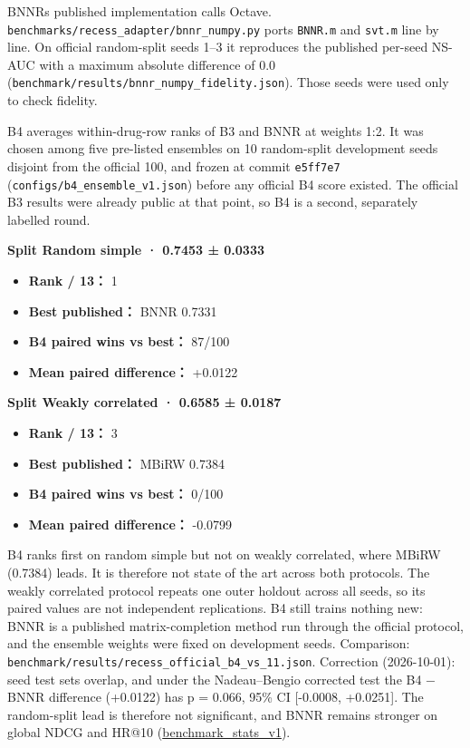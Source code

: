 \documentclass[
  10pt,
]{ctexart}
\providecommand{\tightlist}{%
  \setlength{\itemsep}{0pt}\setlength{\parskip}{0pt}}
\begin{document}
BNNR\textquotesingle s published implementation calls Octave.
\texttt{benchmarks/\allowbreak{}recess\_\allowbreak{}adapter/\allowbreak{}bnnr\_\allowbreak{}numpy.\allowbreak{}py} ports \texttt{BNNR.\allowbreak{}m}
and \texttt{svt.\allowbreak{}m} line by line. On official random-split seeds 1--3 it
reproduces the published per-seed NS-AUC with a maximum absolute
difference of 0.0
(\texttt{benchmark/\allowbreak{}results/\allowbreak{}bnnr\_\allowbreak{}numpy\_\allowbreak{}fidelity.\allowbreak{}json}). Those seeds
were used only to check fidelity.

B4 averages within-drug-row ranks of B3 and BNNR at weights 1:2. It was
chosen among five pre-listed ensembles on 10 random-split development
seeds disjoint from the official 100, and frozen at commit
\texttt{e5ff7e7} (\texttt{configs/\allowbreak{}b4\_\allowbreak{}ensemble\_\allowbreak{}v1.\allowbreak{}json}) before any
official B4 score existed. The official B3 results were already public
at that point, so B4 is a second, separately labelled round.

\textbf{Split Random simple · 0.7453 ± 0.0333}

\begin{itemize}
\tightlist
\item
  \textbf{Rank / 13：} 1
\item
  \textbf{Best published：} BNNR 0.7331
\item
  \textbf{B4 paired wins vs best：} 87/100
\item
  \textbf{Mean paired difference：} +0.0122
\end{itemize}

\textbf{Split Weakly correlated · 0.6585 ± 0.0187}

\begin{itemize}
\tightlist
\item
  \textbf{Rank / 13：} 3
\item
  \textbf{Best published：} MBiRW 0.7384
\item
  \textbf{B4 paired wins vs best：} 0/100
\item
  \textbf{Mean paired difference：} -0.0799
\end{itemize}

B4 ranks first on random simple but not on weakly correlated, where
MBiRW (0.7384) leads. It is therefore not state of the art across both
protocols. The weakly correlated protocol repeats one outer holdout
across all seeds, so its paired values are not independent replications.
B4 still trains nothing new: BNNR is a published matrix-completion
method run through the official protocol, and the ensemble weights were
fixed on development seeds. Comparison:
\texttt{benchmark/\allowbreak{}results/\allowbreak{}recess\_\allowbreak{}official\_\allowbreak{}b4\_\allowbreak{}vs\_\allowbreak{}11.\allowbreak{}json}. Correction
(2026-10-01): seed test sets overlap, and under the Nadeau--Bengio
corrected test the B4 − BNNR difference (+0.0122) has p = 0.066, 95\% CI
{[}-0.0008, +0.0251{]}. The random-split lead is therefore not
significant, and BNNR remains stronger on global NDCG and HR@10
(\href{benchmark_stats_v1.md}{benchmark\_stats\_v1}).
\end{document}
